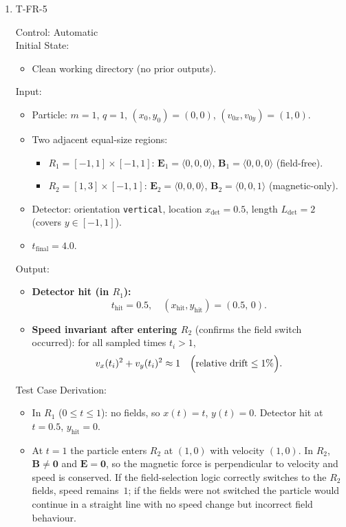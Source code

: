 \documentclass[12pt, titlepage]{article}
\begin{document}
\begin{enumerate}

\item{T-FR-5\\}

Control: Automatic\\

Initial State:
\begin{itemize}
  \item Clean working directory (no prior outputs).
\end{itemize}

Input:
\begin{itemize}
  \item Particle: $m=1$, $q=1$, $(x_0,y_0)=(0,0)$, $(v_{0x},v_{0y})=(1,0)$.
  \item Two adjacent equal-size regions:
    \begin{itemize}
      \item $R_1=[-1,1]\times[-1,1]$:
            $\mathbf{E}_1=\langle 0,0,0\rangle$, $\mathbf{B}_1=\langle 0,0,0\rangle$
            (field-free).
      \item $R_2=[1,3]\times[-1,1]$:
            $\mathbf{E}_2=\langle 0,0,0\rangle$, $\mathbf{B}_2=\langle 0,0,1\rangle$
            (magnetic-only).
    \end{itemize}
  \item Detector: orientation \texttt{vertical}, location $x_{\mathrm{det}}=0.5$,
  length $L_{\mathrm{det}}=2$ (covers $y\in[-1,1]$).
  \item $t_{\text{final}}=4.0$.
\end{itemize}

Output:
\begin{itemize}
  \item \textbf{Detector hit (in $R_1$):}
  \[
    t_{\mathrm{hit}}=0.5,\quad (x_{\mathrm{hit}},y_{\mathrm{hit}})=(0.5,\,0).
  \]
  \item \textbf{Speed invariant after entering $R_2$} (confirms the field switch
        occurred): for all sampled times $t_i > 1$,
  \[
    v_x(t_i)^2+v_y(t_i)^2 \approx 1
    \quad\Bigl(\text{relative drift} \le 1\%\Bigr).
  \]
\end{itemize}

Test Case Derivation:
\begin{itemize}
  \item In $R_1$ ($0\le t\le 1$): no fields, so $x(t)=t$, $y(t)=0$.
        Detector hit at $t=0.5$, $y_{\mathrm{hit}}=0$.
  \item At $t=1$ the particle enters $R_2$ at $(1,0)$ with velocity $(1,0)$.
        In $R_2$, $\mathbf{B}\neq\mathbf{0}$ and $\mathbf{E}=\mathbf{0}$, so the
        magnetic force is perpendicular to velocity and speed is conserved.
        If the field-selection logic correctly switches to the $R_2$ fields, speed
        remains~$1$; if the fields were not switched the particle would continue
        in a straight line with no speed change but incorrect field behaviour.
\end{itemize}


\end{enumerate}
\end{document}
